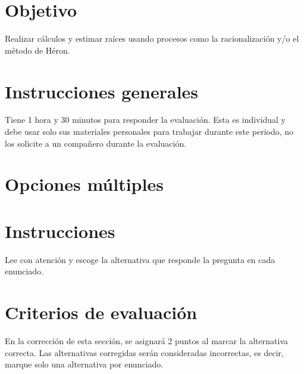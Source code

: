 \documentclass[]{srs}
\begin{document}
\section*{Objetivo}
  Realizar cálculos y estimar raíces usando procesos como la racionalización y/o el método
  de Héron.

\section*{Instrucciones generales}
  Tiene 1 hora y 30 minutos para responder la evaluación. Esta es individual y debe
  usar solo sus materiales personales para trabajar durante este periodo, no los solicite
  a un compañero durante la evaluación.

\section{Opciones múltiples}

\section*{Instrucciones}
Lee con atención y escoge la alternativa que responde la pregunta en cada enunciado.

\section*{Criterios de evaluación}
En la corrección de esta sección, se asignará 2 puntos al marcar la alternativa correcta.
Las alternativas corregidas serán consideradas incorrectas, es decir, marque solo una
alternativa por enunciado.

\separador[2mm]
\end{document}

